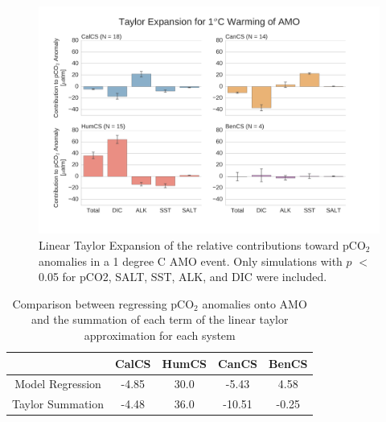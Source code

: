 \documentclass[12pt]{article}
\begin{document}
\clearpage
\begin{figure}[!h]
	\centering
	\includegraphics[width=\linewidth]{../../figs/all-systems/taylor_expansions/taylor-expansion-AMO-pCO2-PVALUEREMOVED-smoothedClimate.png}
	\caption{Linear Taylor Expansion of the relative contributions toward pCO$_{2}$ anomalies in a 1 degree C AMO event. Only simulations with $p$ $<$ 0.05 for pCO2, SALT, SST, ALK, and DIC were included.}
	\label{fig:taylor-amo}
\end{figure}
\begin{table}[!h]
	\centering
	\begin{tabular}{c | c c c c }
		& CalCS & HumCS & CanCS & BenCS \\
		\midrule
		Model Regression & -4.85 & 30.0 & -5.43 & 4.58 \\
		Taylor Summation & -4.48 & 36.0 & -10.51 & -0.25 \\
	\end{tabular}
	\caption{Comparison between regressing pCO$_{2}$ anomalies onto AMO and the summation of each term of the linear taylor approximation for each system}
	\label{tab:taylor-amo}
\end{table}
\end{document}
